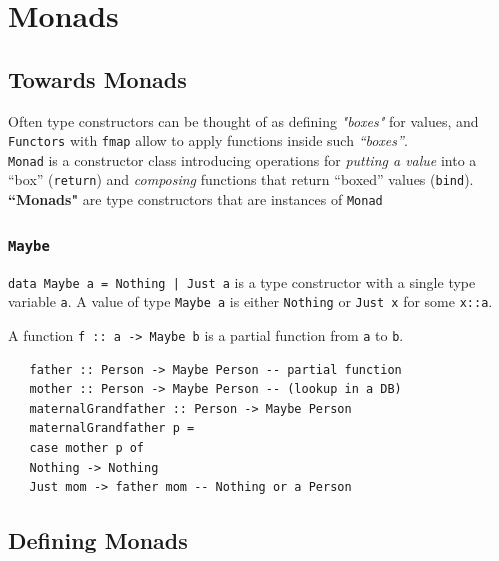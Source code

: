 \chapter{Monads}


\section{Towards Monads}
Often type constructors can be thought of as
defining \textit{"boxes"} for values, and \lstinline|Functors| with \lstinline|fmap| allow to apply functions
inside such \textit{``boxes''}.\\
\lstinline|Monad| is a constructor class introducing
operations for \textit{putting a value} into a ``box'' (\lstinline|return|) and \textit{composing} functions that return ``boxed'' values (\lstinline|bind|).\\
\textbf{``Monads"} are type constructors that are instances of \lstinline|Monad|


\subsection{\texttt{Maybe}}
\lstinline{data Maybe a = Nothing | Just a} is a type constructor with a single type variable \lstinline|a|.
A value of type \lstinline|Maybe a| is either \lstinline|Nothing| or \lstinline|Just x| for some \lstinline|x::a|.

A function \lstinline|f :: a -> Maybe b| is a partial function from
\lstinline|a| to \lstinline|b|.
\begin{lstlisting}
   father :: Person -> Maybe Person -- partial function
   mother :: Person -> Maybe Person -- (lookup in a DB)
   maternalGrandfather :: Person -> Maybe Person
   maternalGrandfather p =
   case mother p of
   Nothing -> Nothing
   Just mom -> father mom -- Nothing or a Person
\end{lstlisting}

\section{Defining Monads}



